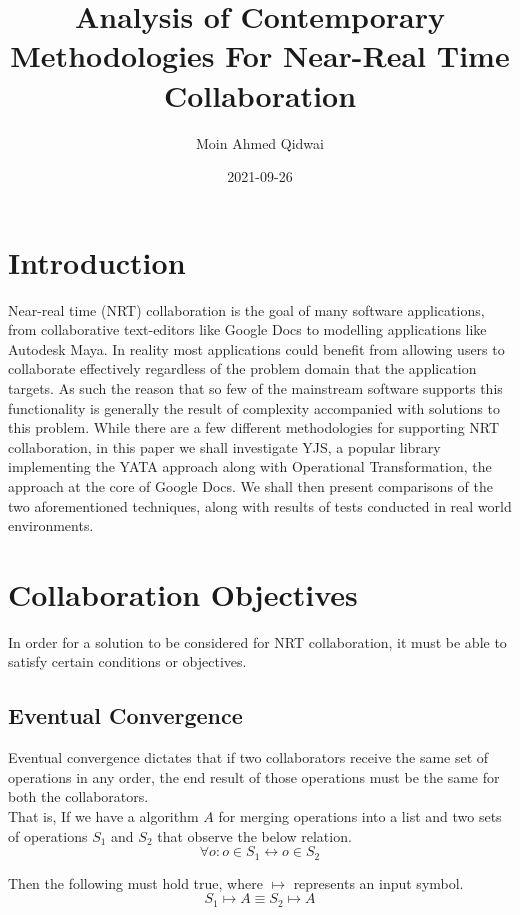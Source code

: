 \documentclass[12pt]{article}
\title{Analysis of Contemporary Methodologies For Near-Real Time Collaboration}
\date{2021-09-26}
\author{Moin Ahmed Qidwai}
\begin{document}
  \maketitle
  \newpage

  \section{Introduction}
  Near-real time (NRT) collaboration is the goal of many software applications, from collaborative text-editors like Google Docs to modelling applications like Autodesk Maya.
  In reality most applications could benefit from allowing users to collaborate effectively regardless of the problem domain that the application targets.
  As such the reason that so few of the mainstream software supports this functionality is generally the result of complexity accompanied with solutions to this problem.
  While there are a few different methodologies for supporting NRT collaboration, in this paper we shall investigate YJS, a popular library implementing the YATA approach along with 
  Operational Transformation, the approach at the core of Google Docs. We shall then present comparisons of the two aforementioned techniques, along with results of tests conducted in real world environments.

  \section{Collaboration Objectives}
  In order for a solution to be considered for NRT collaboration, it must be able to satisfy certain conditions or objectives.
  
  \subsection{Eventual Convergence}
  Eventual convergence dictates that if two collaborators receive the same set of operations in any order,
  the end result of those operations must be the same for both the collaborators.\\
  That is, If we have a algorithm \(A\) for merging operations into a list and two sets of operations \(S_{1}\) and \(S_{2}\) that observe the below relation.
  \begin{equation}
    \forall o : o \in S_{1} \leftrightarrow o \in S_{2}
  \end{equation}
  
  Then the following must hold true, where \(\mapsto\) represents an input symbol.
  \begin{equation}
     S_{1} \mapsto A \equiv S_{2} \mapsto A
  \end{equation}
\end{document}
